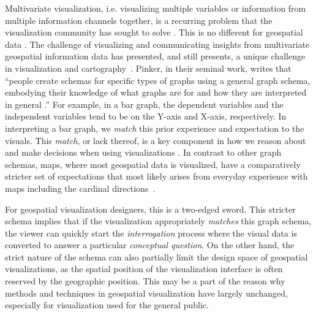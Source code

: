 Multivariate visualization, i.e. visualizing multiple variables  or information from multiple information channels together, is a recurring problem that the visualization community has sought to solve \cite{liu2014survey}. 
%
%    
This is no different for geospatial data \cite{andrienko_geovisualization_2008, guo_multivariate_2005, strode2020bivariate, saha_visualizing_2022}. 
%
The challenge of visualizing and communicating insights from multivariate geospatial information data has presented, and still presents, a unique challenge in visualization and cartography~\cite{bertin1983semiology, Tyner_2014}.
%
Pinker, in their seminal work, writes that ``people create schemas for specific types of graphs using a general graph schema, embodying their knowledge of what graphs are for and how they are interpreted in general \cite{pinker1990a}.''
%
For example, in a bar graph, the dependent variables and the independent variables tend to be on the Y-axis and X-axis, respectively.
%
In interpreting a bar graph, we \textit{match} this prior experience and expectation to the visuals. 
%
This \textit{match}, or lack thereof, is a key component in how we reason about and make decisions when using visualizations \cite{padilla_decision_2018}.
%
In contrast to other graph schemas, maps, where most geospatial data is visualized, have a comparatively stricter set of expectations that most likely arises from everyday experience with maps including the cardinal directions~\cite{hografer2020state}.
 
For geospatial visualization designers, this is a two-edged sword. 
%
This stricter schema implies that if the visualization appropriately \textit{matches} this graph schema, the viewer can quickly start the \textit{interrogation} process where the visual data is converted to answer a particular \textit{conceptual question}.
%
On the other hand, the strict nature of the schema can also partially limit the design space of geospatial visualizations, as the spatial position of the visualization interface is often reserved by the geographic position.
%
%
This may be a part of the reason why methods and techniques in geospatial visualization have largely unchanged, especially for visualization used for the general public.
%

